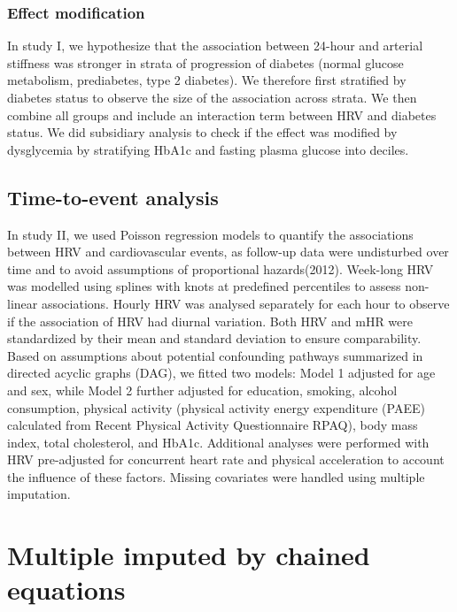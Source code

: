 \documentclass[
  a4paper,
  headsepline=true,
  open=any]{scrbook}
\begin{document}
\hypertarget{effect-modification}{%
\subsubsection{Effect modification}\label{effect-modification}}

In study I, we hypothesize that the association between 24-hour and
arterial stiffness was stronger in strata of progression of diabetes
(normal glucose metabolism, prediabetes, type 2 diabetes). We therefore
first stratified by diabetes status to observe the size of the
association across strata. We then combine all groups and include an
interaction term between HRV and diabetes status. We did subsidiary
analysis to check if the effect was modified by dysglycemia by
stratifying HbA1c and fasting plasma glucose into deciles.

\hypertarget{time-to-event-analysis}{%
\subsection{Time-to-event analysis}\label{time-to-event-analysis}}

In study II, we used Poisson regression models to quantify the
associations between HRV and cardiovascular events, as follow-up data
were undisturbed over time and to avoid assumptions of proportional
hazards(2012). Week-long HRV was modelled using splines with knots at
predefined percentiles to assess non-linear associations. Hourly HRV was
analysed separately for each hour to observe if the association of HRV
had diurnal variation. Both HRV and mHR were standardized by their mean
and standard deviation to ensure comparability. Based on assumptions
about potential confounding pathways summarized in directed acyclic
graphs (DAG), we fitted two models: Model 1 adjusted for age and sex,
while Model 2 further adjusted for education, smoking, alcohol
consumption, physical activity (physical activity energy expenditure
(PAEE) calculated from Recent Physical Activity Questionnaire RPAQ),
body mass index, total cholesterol, and HbA1c. Additional analyses were
performed with HRV pre-adjusted for concurrent heart rate and physical
acceleration to account the influence of these factors. Missing
covariates were handled using multiple imputation.

\hypertarget{multiple-imputed-by-chained-equations}{%
\section{Multiple imputed by chained
equations}\label{multiple-imputed-by-chained-equations}}
\end{document}
